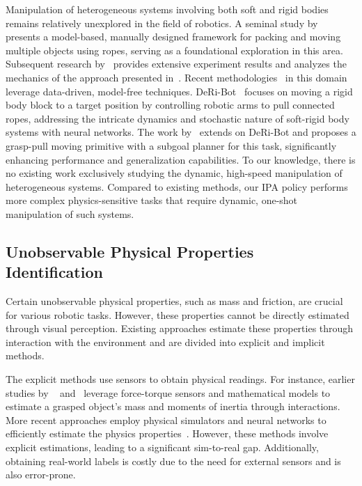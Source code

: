 Manipulation of heterogeneous systems involving both soft and rigid bodies remains relatively unexplored in the field of robotics. A seminal study by~\cite{donald2000distributed} presents a model-based, manually designed framework for packing and moving multiple objects using ropes, serving as a foundational exploration in this area. Subsequent research by~\cite{corke2000experiments,maneewarn2005mechanics} provides extensive experiment results and analyzes the mechanics of the approach presented in~\cite{donald2000distributed}. Recent methodologies~\cite{10225274, wang2023deriigp} in this domain leverage data-driven, model-free techniques. DeRi-Bot~\cite{10225274} focuses on moving a rigid body block to a target position by controlling robotic arms to pull connected ropes, addressing the intricate dynamics and stochastic nature of soft-rigid body systems with neural networks. The work by~\cite{wang2023deriigp} extends on DeRi-Bot and proposes a grasp-pull moving primitive with a subgoal planner for this task, significantly enhancing performance and generalization capabilities. To our knowledge, there is no existing work exclusively studying the dynamic, high-speed manipulation of heterogeneous systems. Compared to existing methods, our IPA policy performs more complex physics-sensitive tasks that require dynamic, one-shot manipulation of such systems. 

\subsection{Unobservable Physical Properties Identification}
\label{subsec:upps}
Certain unobservable physical properties, such as mass and friction, are crucial for various robotic tasks. However, these properties cannot be directly estimated through visual perception. Existing approaches estimate these properties through interaction with the environment and are divided into explicit and implicit methods.

The explicit methods use sensors to obtain physical readings. For instance, earlier studies by ~\cite{atkeson1986estimation} and~\cite{1570351} leverage force-torque sensors and mathematical models to estimate a grasped object's mass and moments of inertia through interactions. More recent approaches employ physical simulators and neural networks to efficiently estimate the physics properties~\cite{NIPS2015_d09bf415,NIPS2017_4c56ff4c,fragkiadaki2016learning}. However, these methods involve explicit estimations, leading to a significant sim-to-real gap. Additionally, obtaining real-world labels is costly due to the need for external sensors and is also error-prone.

